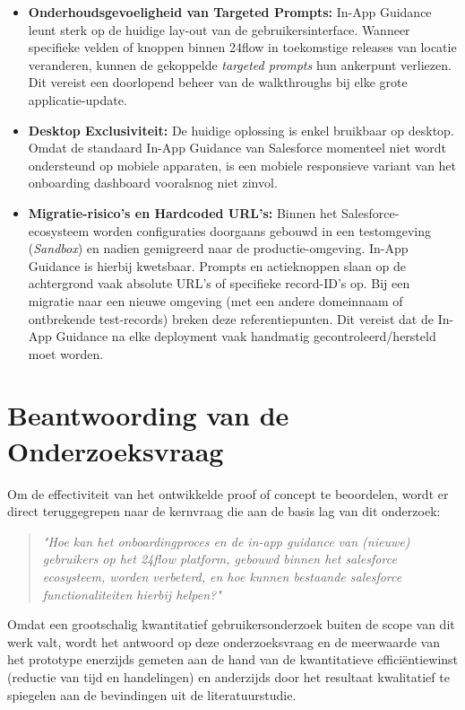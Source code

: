 \begin{itemize}
	\item \textbf{Onderhoudsgevoeligheid van Targeted Prompts:} In-App Guidance leunt sterk op de huidige lay-out van de gebruikersinterface. Wanneer specifieke velden of knoppen binnen 24flow in toekomstige releases van locatie veranderen, kunnen de gekoppelde \textit{targeted prompts} hun ankerpunt verliezen. Dit vereist een doorlopend beheer van de walkthroughs bij elke grote applicatie-update.
	
	\item \textbf{Desktop Exclusiviteit:} De huidige oplossing is enkel bruikbaar op desktop. Omdat de standaard In-App Guidance van Salesforce momenteel niet wordt ondersteund op mobiele apparaten, is een mobiele responsieve variant van het onboarding dashboard vooralsnog niet zinvol.
	
	\item \textbf{Migratie-risico's en Hardcoded URL's:} Binnen het Salesforce-ecosysteem worden configuraties doorgaans gebouwd in een testomgeving (\textit{Sandbox}) en nadien gemigreerd naar de productie-omgeving. In-App Guidance is hierbij kwetsbaar. Prompts en actieknoppen slaan op de achtergrond vaak absolute URL's of specifieke record-ID's op. Bij een migratie naar een nieuwe omgeving (met een andere domeinnaam of ontbrekende test-records) breken deze referentiepunten. Dit vereist dat de In-App Guidance na elke deployment vaak handmatig gecontroleerd/hersteld moet worden.
\end{itemize}

\section{Beantwoording van de Onderzoeksvraag}
\label{subsec:beantwoording_onderzoeksvraag}

Om de effectiviteit van het ontwikkelde proof of concept te beoordelen, wordt er direct teruggegrepen naar de kernvraag die aan de basis lag van dit onderzoek: 
\\

\begin{quote}
	\textit{"Hoe kan het onboardingproces en de in-app guidance van (nieuwe) gebruikers op het 24flow platform, gebouwd binnen het salesforce ecosysteem, worden verbeterd, en hoe kunnen bestaande salesforce functionaliteiten hierbij helpen?"}
\end{quote}

Omdat een grootschalig kwantitatief gebruikersonderzoek buiten de scope van dit werk valt, wordt het antwoord op deze onderzoeksvraag en de meerwaarde van het prototype enerzijds gemeten aan de hand van de kwantitatieve efficiëntiewinst (reductie van tijd en handelingen) en anderzijds door het resultaat kwalitatief te spiegelen aan de bevindingen uit de literatuurstudie.

